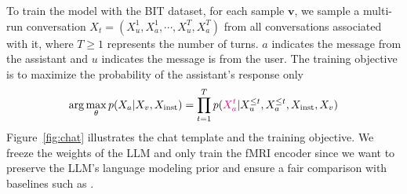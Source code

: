 \begingroup
{}
\begin{table*}[bp]
    \centering
    \vspace{-1.7em}
    \caption{Results of brain captioning. The CIDEr metric is scaled by a factor of 100 for consistency with Table~\ref{tab:caption} and baselines.}
    \label{tab:caption}
\vspace{0.1in}
\end{table*}
\endgroup


To train the model with the BIT dataset, for each sample $\boldsymbol{v}$, we sample a multi-run conversation $X_t = (X_u^1, X_a^1, \cdots, X_u^T, X_a^T)$ from all conversations associated with it, where $T \geq 1$ represents the number of turns. $a$ indicates the message from the assistant and $u$ indicates the message is from the user. The training objective is to maximize the probability of the assistant's response only
$$
\arg\max_\theta p(X_a | X_v, X_{\text{inst}}) = \prod_{t=1}^T p({\color{magenta}X_a^t} | X_u^{\leq t}, X_a^{\le t }, X_\text{inst}, X_v)
$$
Figure~\ref{fig:chat} illustrates the chat template and the training objective. We freeze the weights of the LLM and only train the fMRI encoder since we want to preserve the LLM's language modeling prior and ensure a fair comparison with baselines such as \citet{xia2024umbrae}.

